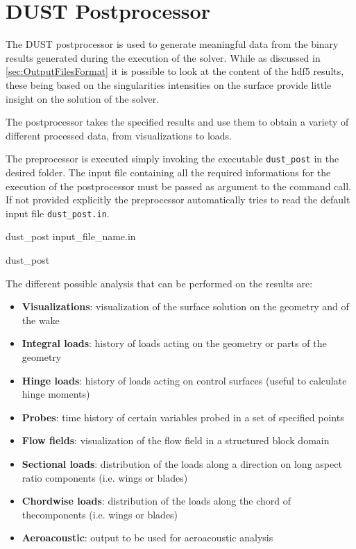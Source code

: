 \chapter{DUST Postprocessor}
\label{ch:Post}

The DUST postprocessor is used to generate meaningful data from the binary 
results generated during the execution of the solver. While as discussed in 
\ref{sec:OutputFilesFormat} it is possible to look at the content of the hdf5 
results, these being based on the singularities intensities on the surface provide 
little insight on the solution of the solver. 

The postprocessor takes the specified results and use them to obtain a variety of 
different processed data, from visualizations to loads. 

The preprocessor is executed simply invoking the executable \texttt{dust\_post} 
in the desired folder. The input file containing all the required informations 
for the execution of the postprocessor must be passed as argument to the command call. 
If not provided explicitly the preprocessor automatically tries to read the default 
input file \texttt{dust\_post.in}.
\begin{command}[caption={Postprocessor command looking for input file 
  \texttt{input\_file\_name.in}}]
  dust_post input_file_name.in
\end{command}

\begin{command}[caption={Postprocessor command looking for 
default input file \texttt{dust\_post.in}}, label={command:dust_post_default}]
  dust_post
\end{command}

The different possible analysis that can be performed on the results are:
\begin{itemize}
  \item \textbf{Visualizations}: visualization of the surface solution 
      on the geometry and of the wake
  \item \textbf{Integral loads}: history of loads acting on the geometry or parts 
      of the geometry
  \item \textbf{Hinge loads}: history of loads acting on control surfaces (useful to calculate 
      hinge moments)
  \item \textbf{Probes}: time history of certain variables probed in a 
      set of specified points
  \item \textbf{Flow fields}: visualization of the flow field in a structured 
      block domain
  \item \textbf{Sectional loads}: distribution of the loads along a direction 
      on long aspect ratio components (i.e. wings or blades)
  \item \textbf{Chordwise loads}: distribution of the loads along the chord 
      of thecomponents (i.e. wings or blades)
  \item \textbf{Aeroacoustic}: output to be used for aeroacoustic analysis 
\end{itemize}



